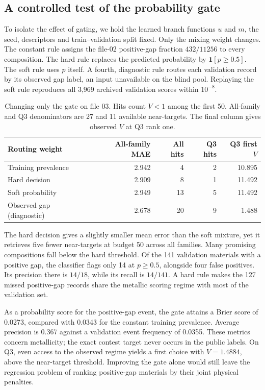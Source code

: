 \subsection{A controlled test of the probability gate}
To isolate the effect of gating, we hold the learned branch functions $u$ and $m$, the seed, descriptors and train--validation split fixed. Only the mixing weight changes. The constant rule assigns the file-02 positive-gap fraction $432/11256$ to every composition. The hard rule replaces the predicted probability by $\mathbf{1}[p\geq0.5]$. The soft rule uses $p$ itself. A fourth, diagnostic rule routes each validation record by its observed gap label, an input unavailable on the blind pool. Replaying the soft rule reproduces all 3,969 archived validation scores within $10^{-8}$.

\begin{table}[ht]
\caption{Changing only the gate on file 03. Hits count $V<1$ among the first 50. All-family and Q3 denominators are 27 and 11 available near-targets. The final column gives observed $V$ at Q3 rank one.}\label{tab:gate}
\centering\small\begin{tabular}{lrrrr}
\toprule Routing weight & All-family MAE & All hits & Q3 hits & Q3 first $V$\\\midrule
Training prevalence & 2.942 & 4 & 2 & 10.895\\
Hard decision & 2.909 & 8 & 1 & 11.492\\
Soft probability & 2.949 & 13 & 5 & 11.492\\
Observed gap (diagnostic) & 2.678 & 20 & 9 & 1.488\\\bottomrule
\end{tabular}
\end{table}

The hard decision gives a slightly smaller mean error than the soft mixture, yet it retrieves five fewer near-targets at budget 50 across all families. Many promising compositions fall below the hard threshold. Of the 141 validation materials with a positive gap, the classifier flags only 14 at $p\geq0.5$, alongside four false positives. Its precision there is $14/18$, while its recall is $14/141$. A hard rule makes the 127 missed positive-gap records share the metallic scoring regime with most of the validation set.

As a probability score for the positive-gap event, the gate attains a Brier score of 0.0273, compared with 0.0343 for the constant training prevalence. Average precision is 0.367 against a validation event frequency of 0.0355. These metrics concern metallicity; the exact contest target never occurs in the public labels. On Q3, even access to the observed regime yields a first choice with $V=1.4884$, above the near-target threshold. Improving the gate alone would still leave the regression problem of ranking positive-gap materials by their joint physical penalties.

